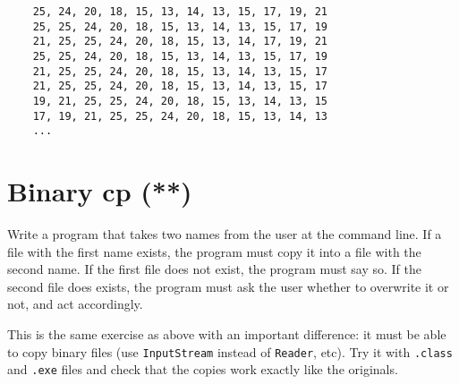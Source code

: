 \documentclass{article}
\begin{document}
\begin{verbatim}
    25, 24, 20, 18, 15, 13, 14, 13, 15, 17, 19, 21 
    25, 25, 24, 20, 18, 15, 13, 14, 13, 15, 17, 19 
    21, 25, 25, 24, 20, 18, 15, 13, 14, 17, 19, 21 
    25, 25, 24, 20, 18, 15, 13, 14, 13, 15, 17, 19 
    21, 25, 25, 24, 20, 18, 15, 13, 14, 13, 15, 17 
    21, 25, 25, 24, 20, 18, 15, 13, 14, 13, 15, 17 
    19, 21, 25, 25, 24, 20, 18, 15, 13, 14, 13, 15 
    17, 19, 21, 25, 25, 24, 20, 18, 15, 13, 14, 13
    ...
\end{verbatim}

\section{Binary cp (**)}
\label{sec:binary-cp}

Write a program that takes two names from the user at the command
line. If a file with the first name exists, the program must copy it
into a file with the second name. If the first file does not exist,
the program must say so. If the second file does exists, the program
must ask the user whether to overwrite it or not, and act accordingly.

This is the same exercise as above with an important difference: it
must be able to copy binary files (use \verb+InputStream+ instead of
\verb+Reader+, etc). Try it with \verb+.class+ and \verb+.exe+ files
and check that the copies work exactly like the originals.
\end{document}
